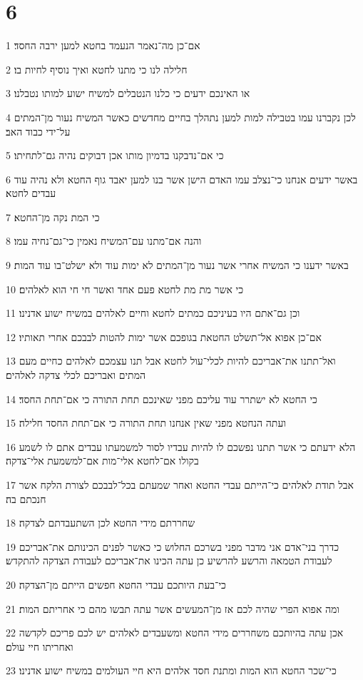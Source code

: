 \chapter{6}

\par 1 אם־כן מה־נאמר הנעמד בחטא למען ירבה החסד׃
\par 2 חלילה לנו כי מתנו לחטא ואיך נוסיף לחיות בו׃
\par 3 או האינכם ידעים כי כלנו הנטבלים למשיח ישוע למותו נטבלנו׃
\par 4 לכן נקברנו עמו בטבילה למות למען נתהלך בחיים מחדשים כאשר המשיח נעור מן־המתים על־ידי כבוד האב׃
\par 5 כי אם־נדבקנו בדמיון מותו אכן דבוקים נהיה גם־לתחיתו׃
\par 6 באשר ידעים אנחנו כי־נצלב עמו האדם הישן אשר בנו למען יאבד גוף החטא ולא נהיה עוד עבדים לחטא׃
\par 7 כי המת נקה מן־החטא׃
\par 8 והנה אם־מתנו עם־המשיח נאמין כי־גם־נחיה עמו׃
\par 9 באשר ידענו כי המשיח אחרי אשר נעור מן־המתים לא ימות עוד ולא ישלט־בו עוד המות׃
\par 10 כי אשר מת מת לחטא פעם אחד ואשר חי חי הוא לאלהים׃
\par 11 וכן גם־אתם היו בעיניכם כמתים לחטא וחיים לאלהים במשיח ישוע אדנינו׃
\par 12 אם־כן אפוא אל־תשלט החטאת בגופכם אשר ימות להטות לבבכם אחרי תאותיו׃
\par 13 ואל־תתנו את־אבריכם להיות לכלי־עול לחטא אבל תנו עצמכם לאלהים כחיים מעם המתים ואבריכם לכלי צדקה לאלהים׃
\par 14 כי החטא לא ישתרר עוד עליכם מפני שאינכם תחת התורה כי אם־תחת החסד׃
\par 15 ועתה הנחטא מפני שאין אנחנו תחת התורה כי אם־תחת החסד חלילה׃
\par 16 הלא ידעתם כי אשר תתנו נפשכם לו להיות עבדיו לסור למשמעתו עבדים אתם לו לשמע בקולו אם־לחטא אלי־מות אם־למשמעת אלי־צדקה׃
\par 17 אבל תודת לאלהים כי־הייתם עבדי החטא ואחר שמעתם בכל־לבבכם לצורת הלקח אשר חנכתם בה׃
\par 18 שחררתם מידי החטא לכן השתעבדתם לצדקה׃
\par 19 כדרך בני־אדם אני מדבר מפני בשרכם החלוש כי כאשר לפנים הכינותם את־אבריכם לעבודת הטמאה והרשע להרשיע כן עתה הכינו את־אבריכם לעבודת הצדקה להתקדש׃
\par 20 כי־בעת היותכם עבדי החטא חפשים הייתם מן־הצדקה׃
\par 21 ומה אפוא הפרי שהיה לכם אז מן־המעשים אשר עתה תבשו מהם כי אחריתם המות׃
\par 22 אכן עתה בהיותכם משחררים מידי החטא ומשעבדים לאלהים יש לכם פריכם לקדשה ואחריתו חיי עולם׃
\par 23 כי־שכר החטא הוא המות ומתנת חסד אלהים היא חיי העולמים במשיח ישוע אדנינו׃

